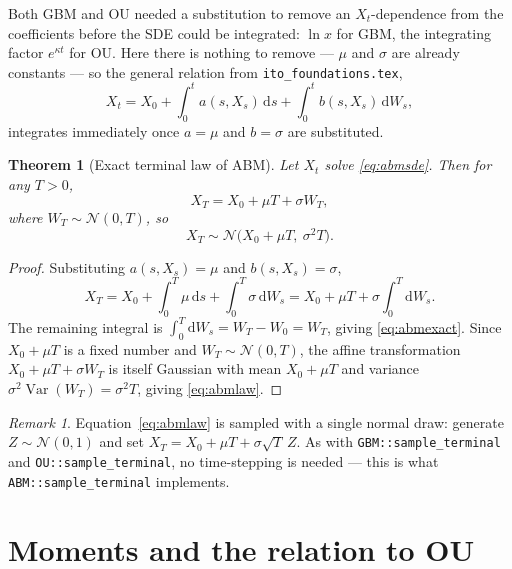 \documentclass[11pt]{article}
\newcommand{\Var}{\operatorname{Var}}
\newcommand{\dd}{\mathrm{d}}
\newcommand{\drift}{a}
\newcommand{\diff}{b}
\theoremstyle{plain}
\newtheorem{theorem}{Theorem}
\theoremstyle{definition}
\theoremstyle{remark}
\newtheorem{remark}{Remark}
\begin{document}
Both GBM and OU needed a substitution to remove an $X_t$-dependence
from the coefficients before the SDE could be integrated: $\ln x$ for
GBM, the integrating factor $e^{\kappa t}$ for OU. Here there is
nothing to remove --- $\mu$ and $\sigma$ are already constants --- so
the general relation from \texttt{ito\_foundations.tex},
\[
   X_t = X_0 + \int_0^t \drift(s,X_s)\,\dd s + \int_0^t \diff(s,X_s)\,\dd W_s,
\]
integrates immediately once $\drift=\mu$ and $\diff=\sigma$ are
substituted.

\begin{theorem}[Exact terminal law of ABM]\label{thm:abm-exact}
Let $X_t$ solve \eqref{eq:abmsde}. Then for any $T>0$,
\begin{equation}\label{eq:abmexact}
   X_T = X_0 + \mu T + \sigma W_T,
\end{equation}
where $W_T\sim\mathcal N(0,T)$, so
\begin{equation}\label{eq:abmlaw}
   X_T \sim \mathcal N\big(X_0+\mu T,\ \sigma^2 T\big).
\end{equation}
\end{theorem}

\begin{proof}
Substituting $\drift(s,X_s)=\mu$ and $\diff(s,X_s)=\sigma$,
\[
   X_T = X_0 + \int_0^T \mu\,\dd s + \int_0^T \sigma\,\dd W_s
       = X_0 + \mu T + \sigma\int_0^T \dd W_s .
\]
The remaining integral is $\int_0^T \dd W_s = W_T - W_0 = W_T$,
giving \eqref{eq:abmexact}. Since $X_0+\mu T$ is a fixed number and
$W_T\sim\mathcal N(0,T)$, the affine transformation
$X_0+\mu T+\sigma W_T$ is itself Gaussian with mean $X_0+\mu T$ and
variance $\sigma^2\Var(W_T)=\sigma^2 T$, giving \eqref{eq:abmlaw}.
\end{proof}

\begin{remark}
Equation~\eqref{eq:abmlaw} is sampled with a single normal draw:
generate $Z\sim\mathcal N(0,1)$ and set
$X_T = X_0+\mu T+\sigma\sqrt T\,Z$. As with \texttt{GBM::sample\_terminal}
and \texttt{OU::sample\_terminal}, no time-stepping is needed --- this
is what \texttt{ABM::sample\_terminal} implements.
\end{remark}

\section{Moments and the relation to OU}
\end{document}
